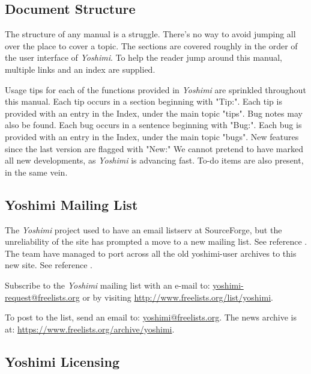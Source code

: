 \documentclass[
 11pt,
 twoside,
 a4paper,
 final                                 %
]{article}
\begin{document}
\subsection{Document Structure}
\label{subsec:introduction_document_structure}

   The structure of any manual is a struggle.
   There's no way to avoid jumping all over the place to
   cover a topic.  The sections are covered roughly
   in the order of the user interface of
   \textsl{Yoshimi}.  To help the reader jump around this manual, multiple
   links and an index are supplied.

   Usage tips
   for each of the functions provided in
   \textsl{Yoshimi} are sprinkled throughout this manual.
   Each tip occurs in a section beginning with "Tip:".
   Each tip is provided with an entry in the Index, under the
   main topic "tips".
   Bug notes may also be found.
   Each bug occurs in a sentence beginning with "Bug:".  Each bug is
   provided with an entry in the Index, under the main topic "bugs".
   New features
   since the last version are flagged with "New:"  We cannot pretend to have
   marked all new developments, as \textsl{Yoshimi} is advancing fast.
   To-do items are also present, in the same vein.

\subsection{Yoshimi Mailing List}
\label{subsec:introduction_mailing_list}

   The \textsl{Yoshimi} project used to have an email listserv at
   SourceForge, but the unreliability of the site has prompted a move to a
   new mailing list.  See reference \cite{yoshiminews}.  The team have
   managed to port across all the old yoshimi-user archives to this new
   site.  See reference \cite{yoshiminewsarchive}.

   Subscribe to the \textsl{Yoshimi} mailing list with an e-mail to:
   \url{yoshimi-request@freelists.org} or by visiting
   \url{http://www.freelists.org/list/yoshimi}.

   To post to the list, send an email to: \url{yoshimi@freelists.org}.
   The news archive is at: \url{https://www.freelists.org/archive/yoshimi}.

\subsection{Yoshimi Licensing}
\label{subsec:introduction_yoshimi_licensing}
\end{document}
